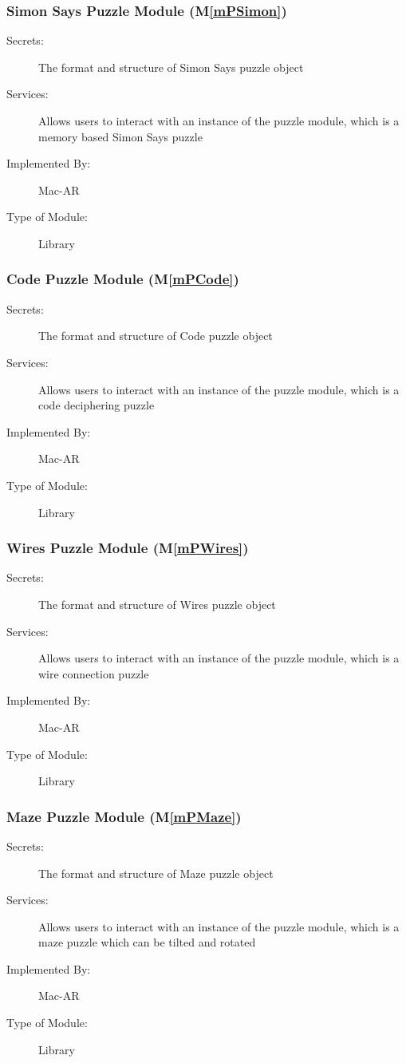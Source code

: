 \documentclass[12pt, titlepage]{article}
\newcommand{\mref}[1]{M\ref{#1}}
\begin{document}
\subsubsection{Simon Says Puzzle Module (\mref{mPSimon})}
\begin{description}
\item[Secrets:]The format and structure of Simon Says puzzle object
\item[Services:]Allows users to interact with an instance of the puzzle module, which is a memory based Simon Says puzzle
\item[Implemented By:] Mac-AR
\item[Type of Module:] Library
\end{description}

\subsubsection{Code Puzzle Module (\mref{mPCode})}
\begin{description}
\item[Secrets:]The format and structure of Code puzzle object
\item[Services:]Allows users to interact with an instance of the puzzle module, which is a code deciphering puzzle
\item[Implemented By:] Mac-AR
\item[Type of Module:] Library
\end{description}

\subsubsection{Wires Puzzle Module (\mref{mPWires})}
\begin{description}
\item[Secrets:]The format and structure of Wires puzzle object
\item[Services:]Allows users to interact with an instance of the puzzle module, which is a wire connection puzzle
\item[Implemented By:] Mac-AR
\item[Type of Module:] Library
\end{description}

\subsubsection{Maze Puzzle Module (\mref{mPMaze})}
\begin{description}
\item[Secrets:]The format and structure of Maze puzzle object
\item[Services:]Allows users to interact with an instance of the puzzle module, which is a maze puzzle which can be tilted and rotated
\item[Implemented By:] Mac-AR
\item[Type of Module:] Library
\end{description}
\end{document}
